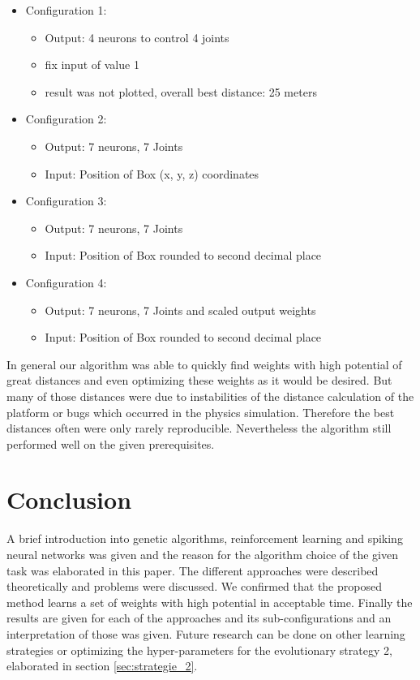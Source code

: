\begin{itemize}
\item Configuration 1: 
\begin{itemize}
\item Output: 4 neurons to control 4 joints
\item fix input of value 1
\item result was not plotted, overall best distance: 25 meters
\end{itemize}
\item Configuration 2: 
\begin{itemize}
\item Output: 7 neurons, 7 Joints 
\item Input: Position of Box (x, y, z) coordinates
\end{itemize}
\item Configuration 3: 
\begin{itemize}
\item Output: 7 neurons, 7 Joints 
\item Input: Position of Box rounded to second decimal place
\end{itemize}
\item Configuration 4: 
\begin{itemize}
\item Output: 7 neurons, 7 Joints and scaled output weights 
\item Input: Position of Box rounded to second decimal place
\end{itemize}
\end{itemize}

In general our algorithm was able to quickly find weights with high potential of great distances and even optimizing these weights as it would be desired. %
But many of those distances were due to instabilities of the distance calculation of the platform or bugs which occurred in the physics simulation. Therefore the best distances often were only rarely reproducible. Nevertheless the algorithm still performed well on the given prerequisites.


\section{Conclusion}
A brief introduction into genetic algorithms, reinforcement learning and spiking neural networks was given and the reason for the algorithm choice of the given task was elaborated in this paper. The different approaches were described theoretically and problems were discussed. We confirmed that the proposed method learns a set of weights with high potential in acceptable time. Finally the results are given for each of the approaches and its sub-configurations and an interpretation of those was given.
Future research can be done on other learning strategies or optimizing the hyper-parameters for the evolutionary strategy 2, elaborated in section \ref{sec:strategie_2}.